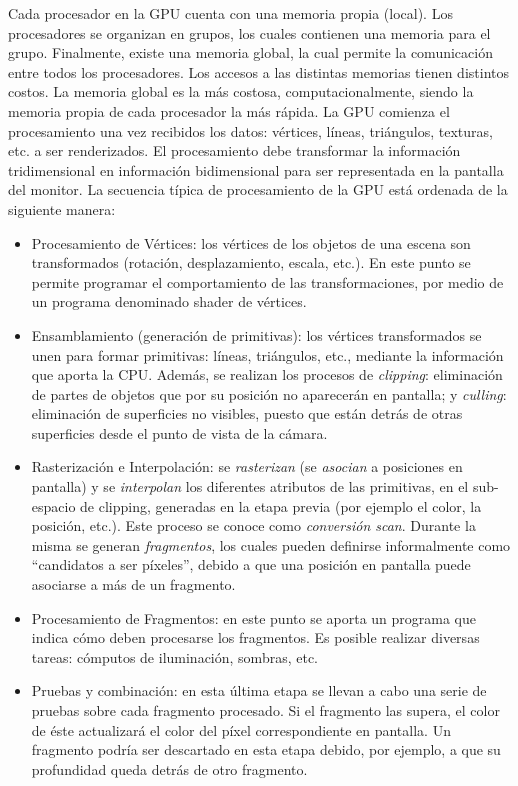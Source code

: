 Cada procesador en la GPU cuenta con una memoria propia (local).
Los procesadores se organizan en grupos, los cuales contienen una memoria para el grupo.
Finalmente, existe una memoria global, la cual permite la comunicación entre todos los procesadores.
Los accesos a las distintas memorias tienen distintos costos.
La memoria global es la más costosa, computacionalmente, siendo la memoria propia de cada procesador la más rápida.
La GPU comienza el procesamiento una vez recibidos los datos: vértices, líneas, triángulos, texturas, etc. a ser renderizados.
El procesamiento debe transformar la información tridimensional en información bidimensional para ser representada en la pantalla del monitor.
La secuencia t\'ipica de procesamiento de la GPU est\'a ordenada de la siguiente manera:
\begin{itemize}
\item Procesamiento de V\'ertices: los v\'ertices de los objetos de una escena son transformados (rotación, desplazamiento, escala, etc.).
En este punto se permite programar el comportamiento de las transformaciones, por medio de un programa denominado shader de vértices.
\item Ensamblamiento (generación de primitivas): los v\'ertices transformados se unen para formar primitivas: l\'ineas, tri\'angulos, etc., mediante la informaci\'on que aporta la CPU.
Además, se realizan los procesos de {\em clipping}: eliminaci\'on de partes de objetos que por su posici\'on no aparecer\'an en pantalla; y {\em culling}: eliminaci\'on de superficies no visibles, puesto que est\'an detr\'as de otras superficies desde el punto de vista de la c\'amara.
\item Rasterización e Interpolaci\'on: se {\em rasterizan} (se {\em asocian} a posiciones en pantalla) y se {\em interpolan} los diferentes atributos de las primitivas, en el sub-espacio de clipping, generadas en la etapa previa (por ejemplo el color, la posición, etc.).
Este proceso se conoce como {\em conversi\'on scan}.
Durante la misma se generan {\em fragmentos}, los cuales pueden definirse informalmente como ``candidatos a ser p\'ixeles'', debido a que una posición en pantalla puede asociarse a más de un fragmento.
\item Procesamiento de Fragmentos: en este punto se aporta un programa que indica cómo deben procesarse los fragmentos.
Es posible realizar diversas tareas: cómputos de iluminación, sombras, etc.
\item Pruebas y combinación: en esta \'ultima etapa se llevan a cabo una serie de pruebas sobre cada fragmento procesado.
Si el fragmento las supera, el color de éste actualizará el color del píxel correspondiente en pantalla.
Un fragmento podría ser descartado en esta etapa debido, por ejemplo, a que su profundidad queda detrás de otro fragmento.
\end{itemize}

